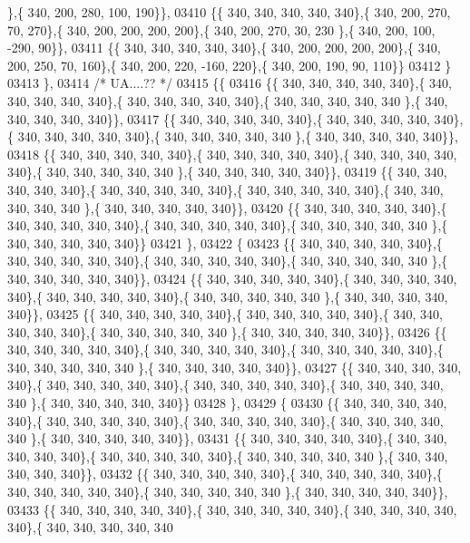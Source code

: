 \begin{DoxyCode}
      \},\{ 340, 200, 280, 100, 190\}\},
03410 \{\{ 340, 340, 340, 340, 340\},\{ 340, 200, 270,  70, 270\},\{ 340, 200, 200, 200, 200\},\{ 340, 200, 270,  30, 230
      \},\{ 340, 200, 100, -290,  90\}\},
03411 \{\{ 340, 340, 340, 340, 340\},\{ 340, 200, 200, 200, 200\},\{ 340, 200, 250,  70, 160\},\{ 340, 200, 220, -160, 
      220\},\{ 340, 200, 190,  90, 110\}\}
03412 \}
03413 \},
03414 \textcolor{comment}{/* UA....?? */}
03415 \{\{
03416 \{\{ 340, 340, 340, 340, 340\},\{ 340, 340, 340, 340, 340\},\{ 340, 340, 340, 340, 340\},\{ 340, 340, 340, 340, 340
      \},\{ 340, 340, 340, 340, 340\}\},
03417 \{\{ 340, 340, 340, 340, 340\},\{ 340, 340, 340, 340, 340\},\{ 340, 340, 340, 340, 340\},\{ 340, 340, 340, 340, 340
      \},\{ 340, 340, 340, 340, 340\}\},
03418 \{\{ 340, 340, 340, 340, 340\},\{ 340, 340, 340, 340, 340\},\{ 340, 340, 340, 340, 340\},\{ 340, 340, 340, 340, 340
      \},\{ 340, 340, 340, 340, 340\}\},
03419 \{\{ 340, 340, 340, 340, 340\},\{ 340, 340, 340, 340, 340\},\{ 340, 340, 340, 340, 340\},\{ 340, 340, 340, 340, 340
      \},\{ 340, 340, 340, 340, 340\}\},
03420 \{\{ 340, 340, 340, 340, 340\},\{ 340, 340, 340, 340, 340\},\{ 340, 340, 340, 340, 340\},\{ 340, 340, 340, 340, 340
      \},\{ 340, 340, 340, 340, 340\}\}
03421 \},
03422 \{
03423 \{\{ 340, 340, 340, 340, 340\},\{ 340, 340, 340, 340, 340\},\{ 340, 340, 340, 340, 340\},\{ 340, 340, 340, 340, 340
      \},\{ 340, 340, 340, 340, 340\}\},
03424 \{\{ 340, 340, 340, 340, 340\},\{ 340, 340, 340, 340, 340\},\{ 340, 340, 340, 340, 340\},\{ 340, 340, 340, 340, 340
      \},\{ 340, 340, 340, 340, 340\}\},
03425 \{\{ 340, 340, 340, 340, 340\},\{ 340, 340, 340, 340, 340\},\{ 340, 340, 340, 340, 340\},\{ 340, 340, 340, 340, 340
      \},\{ 340, 340, 340, 340, 340\}\},
03426 \{\{ 340, 340, 340, 340, 340\},\{ 340, 340, 340, 340, 340\},\{ 340, 340, 340, 340, 340\},\{ 340, 340, 340, 340, 340
      \},\{ 340, 340, 340, 340, 340\}\},
03427 \{\{ 340, 340, 340, 340, 340\},\{ 340, 340, 340, 340, 340\},\{ 340, 340, 340, 340, 340\},\{ 340, 340, 340, 340, 340
      \},\{ 340, 340, 340, 340, 340\}\}
03428 \},
03429 \{
03430 \{\{ 340, 340, 340, 340, 340\},\{ 340, 340, 340, 340, 340\},\{ 340, 340, 340, 340, 340\},\{ 340, 340, 340, 340, 340
      \},\{ 340, 340, 340, 340, 340\}\},
03431 \{\{ 340, 340, 340, 340, 340\},\{ 340, 340, 340, 340, 340\},\{ 340, 340, 340, 340, 340\},\{ 340, 340, 340, 340, 340
      \},\{ 340, 340, 340, 340, 340\}\},
03432 \{\{ 340, 340, 340, 340, 340\},\{ 340, 340, 340, 340, 340\},\{ 340, 340, 340, 340, 340\},\{ 340, 340, 340, 340, 340
      \},\{ 340, 340, 340, 340, 340\}\},
03433 \{\{ 340, 340, 340, 340, 340\},\{ 340, 340, 340, 340, 340\},\{ 340, 340, 340, 340, 340\},\{ 340, 340, 340, 340, 340

\end{DoxyCode}
